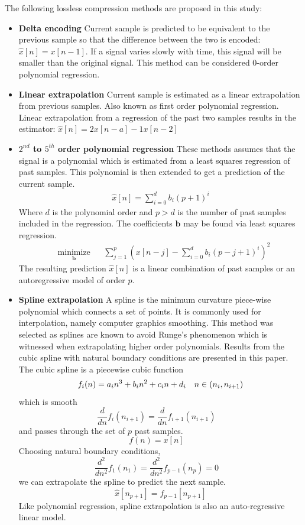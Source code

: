 \documentclass[journal]{IEEEtran}
\begin{document}
The following lossless compression methods are proposed in this study:
\begin{itemize}
  \item \textbf{Delta encoding} Current sample is predicted to be equivalent to the previous sample so that the difference between the two is encoded: $\hat{x}[n] = x[n-1]$. If a signal varies slowly with time, this signal will be smaller than the original signal. This method can be considered 0-order polynomial regression.
  \item \textbf{Linear extrapolation} Current sample is estimated as a linear extrapolation from previous samples. Also known as first order polynomial regression. Linear extrapolation from a regression of the past two samples results in the estimator: $\hat{x}[n] = 2x[n-a] - 1x[n-2]$ 
  \item \textbf{\boldmath$2^{nd}$ to \boldmath$5^{th}$ order polynomial regression} These methods assumes that the signal is a polynomial which is estimated from a least squares regression of past samples. This polynomial is then extended to get a prediction of the current sample.
\begin{equation*}
\begin{aligned}
\hat{x}[n] = \sum_{i=0}^{d}b_i(p+1)^i
\end{aligned}
\end{equation*}
Where $d$ is the polynomial order and $p>d$ is the number of past samples included in the regression. The coefficients $\mathbf{b}$ may be found via least squares regression.
\begin{equation*}
\begin{aligned}
& \underset{\mathbf{b}}{\text{minimize}}
& & \sum_{j=1}^{p} \left( x[n-j] - \sum_{i=0}^{d} b_i(p-j+1)^i \right)^2
\end{aligned}
\end{equation*}
The resulting prediction $\hat{x}[n]$ is a linear combination of past samples or an autoregressive model of order $p$.


  \item \textbf{Spline extrapolation} A spline is the minimum curvature piece-wise polynomial which connects a set of points. It is commonly used for interpolation, namely computer graphics smoothing. This method was selected as splines are known to avoid Runge's phenomenon which is witnessed when extrapolating higher order polynomials. Results from the cubic spline with natural boundary conditions are presented in this paper. The cubic spline is a piecewise cubic function 
$$
f_i(n) = a_in^3  + b_in^2 + c_in + d_i \quad n \in(n_i, n_{i+1}) \\
$$
which is smooth
$$
\frac{d}{dn} f_i(n_{i+1}) = \frac{d}{dn} f_{i+1}(n_{i+1}) \quad
$$
and passes through the set of $p$ past samples.
$$
f(n) = x[n] \quad
$$
Choosing natural boundary conditions,
$$
\frac{d^2}{dn^2}f_1(n_1) = \frac{d^2}{dn^2}f_{p-1}(n_p) = 0 \quad
$$
we can extrapolate the spline to predict the next sample.
$$
\hat{x}[n_{p+1}] = f_{p-1}[n_{p+1}]
$$
Like polynomial regression, spline extrapolation is also an auto-regressive linear model.
\end{itemize}
\end{document}
